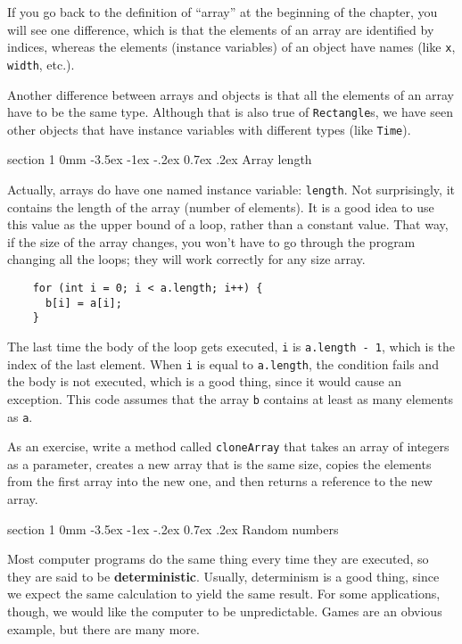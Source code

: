 \documentclass{book}
\makeatletter
\renewcommand{\section}{\@startsection 
    {section} {1} {0mm}%
    {-3.5ex \@plus -1ex \@minus -.2ex}%
    {0.7ex \@plus.2ex}%
    {\normalfont\Large\bfseries}}
\makeatother
\begin{document}
If you go back to the definition of ``array'' at the beginning
of the chapter, you will see one difference, which is that the
elements of an array are identified by indices, whereas the
elements (instance variables) of an object have names
(like {\tt x}, {\tt width}, etc.).

Another difference between arrays and objects is that all the
elements of an array have to be the same type.  Although that
is also true of {\tt Rectangle}s, we have seen other objects
that have instance variables with different types (like
{\tt Time}).

\section{Array length}

Actually, arrays do have one named instance variable: {\tt length}.
Not surprisingly, it contains the length of the array (number
of elements).  It is a good idea to use this value as the upper
bound of a loop, rather than a constant value.  That way, if
the size of the array changes, you won't have to go through the
program changing all the loops; they will work correctly for any
size array.

\begin{verbatim}
    for (int i = 0; i < a.length; i++) {
      b[i] = a[i];
    }
\end{verbatim}
%
The last time the body of the loop gets executed, {\tt i}
is {\tt a.length - 1}, which is the index of the last element.  When
{\tt i} is equal to {\tt a.length}, the condition fails and the body
is not executed, which is a good thing, since it would cause an
exception.  This code assumes that the array {\tt b} contains at least
as many elements as {\tt a}.

As an exercise, write a method called {\tt cloneArray} that takes an
array of integers as a parameter, creates a new array that is the same
size, copies the elements from the first array into the new one, and
then returns a reference to the new array.

\section{Random numbers}
\label{random}
\label{pseudorandom}

Most computer programs do the same thing every time they are executed,
so they are said to be {\bf deterministic}.  Usually, determinism is a
good thing, since we expect the same calculation to yield the same
result.  For some applications, though, we would like the
computer to be unpredictable.  Games are an obvious example, but
there are many more.
\end{document}
